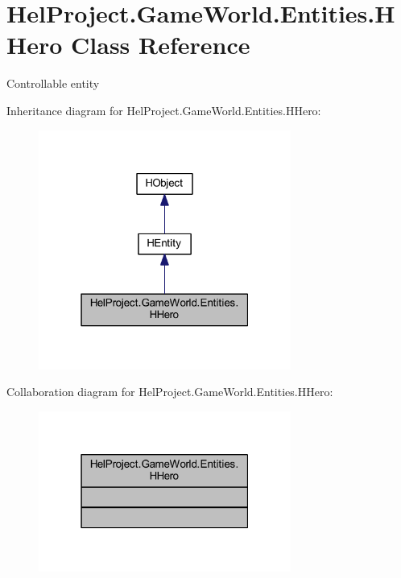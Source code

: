 \hypertarget{class_hel_project_1_1_game_world_1_1_entities_1_1_h_hero}{}\section{Hel\+Project.\+Game\+World.\+Entities.\+H\+Hero Class Reference}
\label{class_hel_project_1_1_game_world_1_1_entities_1_1_h_hero}


Controllable entity  




Inheritance diagram for Hel\+Project.\+Game\+World.\+Entities.\+H\+Hero\+:
\nopagebreak
\begin{figure}[H]
\begin{center}
\leavevmode
\includegraphics[width=235pt]{class_hel_project_1_1_game_world_1_1_entities_1_1_h_hero__inherit__graph}
\end{center}
\end{figure}


Collaboration diagram for Hel\+Project.\+Game\+World.\+Entities.\+H\+Hero\+:
\nopagebreak
\begin{figure}[H]
\begin{center}
\leavevmode
\includegraphics[width=235pt]{class_hel_project_1_1_game_world_1_1_entities_1_1_h_hero__coll__graph}
\end{center}
\end{figure}
